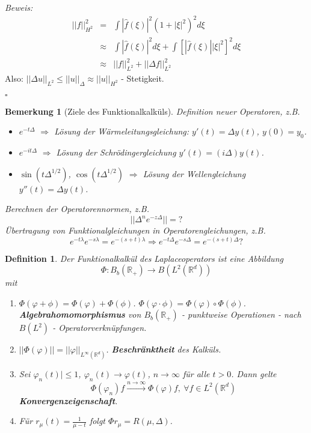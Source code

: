 \documentclass[11pt,a4paper,titlepage, ngerman]{scrartcl}
\newtheorem{Definition}[Satz]{Definition}
\newtheorem{Bemerkung}[Satz]{Bemerkung}
\numberwithin{equation}{section}
\newcommand{\R}{\mathbb{R}} %
\newcommand{\f}{\hat{f}}
\newcommand{\m}{\cdot}
\newcommand{\Bew}{\emph{Beweis: }}
\newcommand{\qed}{\begin{flushright}
		$\square$
	\end{flushright}}
\begin{document}
	\Bew 
	\begin{eqnarray}
		||f||_{H^2}^2 &=& \int |\f(\xi)|^2(1+|\xi|^2)^2 d\xi\nonumber\\
		&\approx& \int |\f(\xi)|^2d\xi + \int\left[|\f(\xi)||\xi|^2 \right]^2d\xi\nonumber\\
		&\approx& ||f||_{L^2}^2 + ||\Delta f||_{L^2}^2\nonumber
	\end{eqnarray}
	Also: $||\Delta u||_{L^2} \leq ||u||_\Delta\approx ||u||_{H^2}$ - Stetigkeit.
	\qed
	
	\begin{Bemerkung}[Ziele des Funktionalkalküls]
		Definition neuer Operatoren, z.B.
		\begin{itemize}
			\item $e^{-t\Delta}$ $\Rightarrow$ Lösung der Wärmeleitungsgleichung: $y'(t)=\Delta y(t)$, $y(0) = y_0$.
			\item $e^{-i t\Delta}$ $\Rightarrow$ Lösung der Schrödingergleichung $y'(t) = (i\Delta) y(t)$.
			\item $\sin(t\Delta^{1/2})$, $\cos(t\Delta^{1/2})$ $\Rightarrow$ Lösung der Wellengleichung $y''(t) = \Delta y(t)$.
		\end{itemize}
		Berechnen der Operatorennormen, z.B.
		$$||\Delta^n e^{-z\Delta}|| = ?$$
		Übertragung von Funktionalgleichungen in Operatorengleichungen, z.B. 
		$$e^{-t\lambda}e^{-s\lambda} = e^{-(s+t)\lambda} \Rightarrow e^{-t\Delta}e^{-s\Delta} = e^{-(s+t)\Delta} ?$$
	\end{Bemerkung}
	
	\begin{Definition}
		Der Funktionalkalkül des Laplaceoperators ist eine Abbildung
		$$\Phi: B_b(\R_+)\rightarrow B(L^2(\R^d))$$
		mit
		\begin{enumerate}
			\item[(i)] $\Phi(\varphi +\phi) = \Phi(\varphi)+ \Phi(\phi)$. $\Phi(\varphi\m \phi) = \Phi(\varphi)\circ\Phi(\phi)$. \textbf{Algebrahomomorphismus} von $B_b(\R_+)$ - punktweise Operationen - nach $B(L^2)$ - Operatorverknüpfungen.
			\item[(ii)] $||\Phi(\varphi)|| = ||\varphi||_{L^{\infty}(\R^d)}$. \textbf{Beschränktheit} des Kalküls.
			\item[(iii)] Sei $\varphi_n(t)|\leq 1$, $\varphi_n(t)\rightarrow \varphi(t)$, $n\rightarrow\infty$ für alle $t>0$. Dann gelte
			$$\Phi(\varphi_n)f\overset{n\rightarrow\infty}{\longrightarrow} \Phi(\varphi)f, ~\forall f\in L^2(\R^d)$$
			\textbf{Konvergenzeigenschaft}.
			\item[(iv)] Für $r_\mu(t) =\frac{1}{\mu-t}$ folgt $\Phi r_\mu = R(\mu, \Delta)$.
		\end{enumerate}
	\end{Definition}
	
\end{document}
